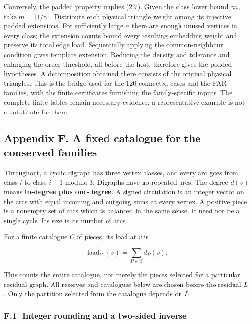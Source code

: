 \documentclass[english,11pt,a4paper]{article}
\newcounter{none}
\begin{document}
Conversely, the padded property implies (2.7). Given the class lower bound \(\gamma n\), take \(m=\lceil1/\gamma\rceil\). Distribute each physical triangle weight among its injective padded extensions. For sufficiently large \(n\) there are enough unused vertices in every class; the extension counts bound every resulting embedding weight and preserve its total edge load. Sequentially applying the common-neighbour condition gives template extension. Reducing the density and tolerance and enlarging the order threshold, all before the host, therefore gives the padded hypotheses. A decomposition obtained there consists of the original physical triangles. This is the bridge used for the 120 connected cases and the PAR families, with the finite certificates furnishing the family-specific inputs. The complete finite tables remain necessary evidence; a representative example is not a substitute for them.

\subsection{Appendix F. A fixed catalogue for the conserved families}\label{appendix-f.-a-fixed-catalogue-for-the-conserved-families}

Throughout, a cyclic digraph has three vertex classes, and every arc goes from class \(i\) to class \(i+1\) modulo 3. Digraphs have no repeated arcs. The degree \(d(v)\) means \textbf{in-degree plus out-degree}. A signed circulation is an integer vector on the arcs with equal incoming and outgoing sums at every vertex. A positive piece is a nonempty set of arcs which is balanced in the same sense. It need not be a single cycle. Its size is its number of arcs.

For a finite catalogue \(C\) of pieces, its load at \(v\) is

\[\operatorname{load}_{\mathcal C}(v)=\sum_{P\in\mathcal C}d_P(v).\]

This counts the entire catalogue, not merely the pieces selected for a particular residual graph. All reserves and catalogues below are chosen before the residual \(L\). Only the partition selected from the catalogue depends on \(L\).

\subsubsection{F.1. Integer rounding and a two-sided inverse}\label{f.1.-integer-rounding-and-a-two-sided-inverse}
\end{document}
